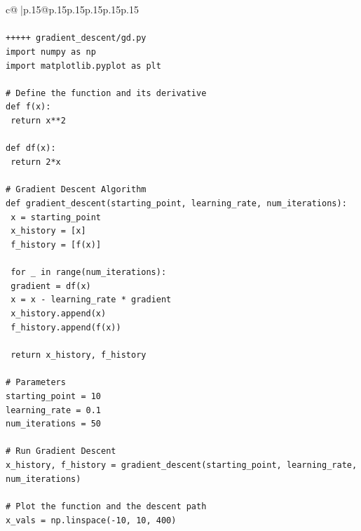 \documentclass{article}
\begin{document}
{\begin{supertabular}{c@{$\;$}|p{.15\linewidth}@{}p{.15\linewidth}p{.15\linewidth}p{.15\linewidth}p{.15\linewidth}p{.15\linewidth}}
{{{\\ 
\\ 
\texttt{+++++ gradient\_descent/gd.py} \\
\texttt{import numpy as np} \\
\texttt{import matplotlib.pyplot as plt} \\
\\ 
\texttt{\# Define the function and its derivative} \\
\texttt{def f(x):} \\
\texttt{    return x**2} \\
\\ 
\texttt{def df(x):} \\
\texttt{    return 2*x} \\
\\ 
\texttt{\# Gradient Descent Algorithm} \\
\texttt{def gradient\_descent(starting\_point, learning\_rate, num\_iterations):} \\
\texttt{    x = starting\_point} \\
\texttt{    x\_history = {[}x{]}} \\
\texttt{    f\_history = {[}f(x){]}} \\
\\ 
\texttt{    for \_ in range(num\_iterations):} \\
\texttt{        gradient = df(x)} \\
\texttt{        x = x {-} learning\_rate * gradient} \\
\texttt{        x\_history.append(x)} \\
\texttt{        f\_history.append(f(x))} \\
\\ 
\texttt{    return x\_history, f\_history} \\
\\ 
\texttt{\# Parameters} \\
\texttt{starting\_point = 10} \\
\texttt{learning\_rate = 0.1} \\
\texttt{num\_iterations = 50} \\
\\ 
\texttt{\# Run Gradient Descent} \\
\texttt{x\_history, f\_history = gradient\_descent(starting\_point, learning\_rate, num\_iterations)} \\
\\ 
\texttt{\# Plot the function and the descent path} \\
\texttt{x\_vals = np.linspace({-}10, 10, 400)} \\
}}}
\end{supertabular}}
\end{document}
